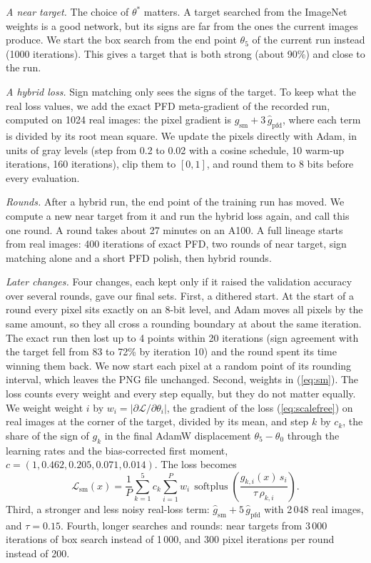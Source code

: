 \documentclass[journal]{IEEEtran}
\begin{document}
\emph{A near target.} The choice of $\theta^\ast$ matters. A target searched from the ImageNet weights is a good
network, but its signs are far from the ones the current images produce. We start the box search from the end point
$\theta_5$ of the current run instead (1000 iterations). This gives a target that is both strong (about 90\%) and
close to the run.

\emph{A hybrid loss.} Sign matching only sees the signs of the target. To keep what the real loss values, we add
the exact PFD meta-gradient of the recorded run, computed on 1024 real images: the pixel gradient is
$\hat g_{\mathrm{sm}}+3\,\hat g_{\mathrm{pfd}}$, where each term is divided by its root mean square. We update the
pixels directly with Adam, in units of gray levels (step from 0.2 to 0.02 with a cosine schedule, 10 warm-up
iterations, 160 iterations), clip them to $[0,1]$, and round them to 8 bits before every evaluation.

\emph{Rounds.} After a hybrid run, the end point of the training run has moved. We compute a new near target from
it and run the hybrid loss again, and call this one round. A round takes about 27 minutes on an A100. A full
lineage starts from real images: 400 iterations of exact PFD, two rounds of near target, sign matching alone and a
short PFD polish, then hybrid rounds.

\emph{Later changes.} Four changes, each kept only if it raised the validation accuracy over several rounds, gave our
final sets. First, a dithered start. At the start of a round every pixel sits exactly on an 8-bit level, and Adam
moves all pixels by the same amount, so they all cross a rounding boundary at about the same iteration. The exact
run then lost up to 4 points within 20 iterations (sign agreement with the target fell from 83 to 72\% by iteration
10) and the round spent its time winning them back. We now start each pixel at a random point of its rounding
interval, which leaves the PNG file unchanged. Second, weights in (\ref{eq:sm}). The loss counts every weight and
every step equally, but they do not matter equally. We weight weight $i$ by $w_i=|\partial\mathcal{L}/\partial
\theta_i|$, the gradient of the loss (\ref{eq:scalefree}) on real images at the corner of the target, divided by its
mean, and step $k$ by $c_k$, the share of the sign of $g_k$ in the final AdamW displacement $\theta_5-\theta_0$
through the learning rates and the bias-corrected first moment, $c=(1, 0.462, 0.205, 0.071, 0.014)$. The loss
becomes
\begin{equation}
\mathcal{L}_{\mathrm{sm}}(x) = \frac{1}{P}\sum_{k=1}^{5}c_k\sum_{i=1}^{P}w_i\,
\operatorname{softplus}\!\left(\frac{g_{k,i}(x)\,s_i}{\tau\,\rho_{k,i}}\right).
\label{eq:smw}
\end{equation}
Third, a stronger and less noisy real-loss term: $\hat g_{\mathrm{sm}}+5\,\hat g_{\mathrm{pfd}}$ with 2\,048 real
images, and $\tau=0.15$. Fourth, longer searches and rounds: near targets from 3\,000 iterations of box search
instead of 1\,000, and 300 pixel iterations per round instead of 200.
\end{document}
